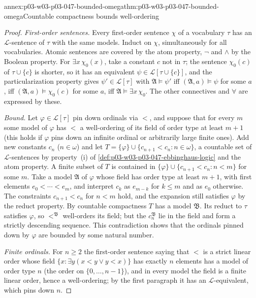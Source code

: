 \begin{annexitem}{annex:p03-w03-p03-047-bounded-omega}{thm:p03-w03-p03-047-bounded-omega}{Countable compactness bounds well-ordering}
\begin{proof}
\emph{First-order sentences.}  Every first-order sentence \(\chi\) of a
vocabulary \(\tau\) has an \(\mathscr L\)-sentence of \(\tau\) with the same
models.  Induct on \(\chi\), simultaneously for all vocabularies.  Atomic
sentences are covered by the atom property, \(\neg\) and \(\land\) by the
Boolean property.  For \(\exists x\,\chi_0(x)\), take a constant \(c\) not in
\(\tau\); the sentence \(\chi_0(c)\) of \(\tau\cup\{c\}\) is shorter, so it has
an equivalent \(\psi\in\mathscr L[\tau\cup\{c\}]\), and the
particularization property gives \(\psi'\in\mathscr L[\tau]\) with
\(\mathfrak A\models\psi'\) iff \((\mathfrak A,a)\models\psi\) for some
\(a\), iff \((\mathfrak A,a)\models\chi_0(c)\) for some \(a\), iff
\(\mathfrak A\models\exists x\,\chi_0\).  The other connectives and
\(\forall\) are expressed by these.

\emph{Bound.}  Let \(\varphi\in\mathscr L[\tau]\) pin down ordinals via
\(<\), and suppose that for every \(m\) some model of \(\varphi\) has
\(<\) a well-ordering of its field of order type at least \(m+1\) (this
holds if \(\varphi\) pins down an infinite ordinal or arbitrarily large
finite ones).  Add new constants \(c_n\) (\(n\in\omega\)) and let
\(T=\{\varphi\}\cup\{c_{n+1}<c_n:n\in\omega\}\), a countable set of
\(\mathscr L\)-sentences by property~(i) of
\cref{def:p03-w03-p03-047-ebbinghaus-logic} and the atom property.  A finite
subset of \(T\) is contained in \(\{\varphi\}\cup\{c_{n+1}<c_n:n<m\}\) for
some \(m\).  Take a model \(\mathfrak A\) of \(\varphi\) whose field has
order type at least \(m+1\), with first elements \(e_0<\cdots<e_m\), and
interpret \(c_k\) as \(e_{m-k}\) for \(k\le m\) and as \(e_0\) otherwise.
The constraints \(c_{n+1}<c_n\) for \(n<m\) hold, and the expansion still
satisfies \(\varphi\) by the reduct property.  By countable compactness
\(T\) has a model \(\mathfrak B\).  Its reduct to \(\tau\) satisfies
\(\varphi\), so \(<^{\mathfrak B}\) well-orders its field; but the
\(c_n^{\mathfrak B}\) lie in the field and form a strictly descending
sequence.  This contradiction shows that the ordinals pinned down by
\(\varphi\) are bounded by some natural number.

\emph{Finite ordinals.}  For \(n\ge2\) the first-order sentence saying that
\(<\) is a strict linear order whose field
\(\{x:\exists y(x<y\lor y<x)\}\) has exactly \(n\) elements has a model of
order type \(n\) (the order on \(\{0,\ldots,n-1\}\)), and in every model the
field is a finite linear order, hence a well-ordering; by the first
paragraph it has an \(\mathscr L\)-equivalent, which pins down \(n\).


\end{proof}
\end{annexitem}
